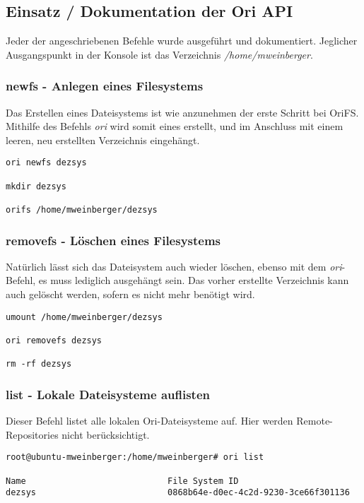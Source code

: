 \subsection{Einsatz / Dokumentation der Ori API}
\label{subsec:Einsatz / Dokumentation der Ori API}
Jeder der angeschriebenen Befehle wurde ausgeführt und dokumentiert. Jeglicher Ausgangspunkt in der Konsole ist das Verzeichnis \textit{/home/mweinberger}.

\subsubsection{newfs - Anlegen eines Filesystems}
\label{subsubsec:newfs - Anlegen eines Filesystems}
Das Erstellen eines Dateisystems ist wie anzunehmen der erste Schritt bei OriFS. Mithilfe des Befehls \textit{ori} wird somit eines erstellt, und im Anschluss mit einem leeren, neu erstellten Verzeichnis eingehängt.
\begin{lstlisting}[frame=single, caption=newfs]
ori newfs dezsys

mkdir dezsys

orifs /home/mweinberger/dezsys
\end{lstlisting}

\subsubsection{removefs - Löschen eines Filesystems}
\label{subsubsec:removefs - Löschen eines Filesystems}
Natürlich lässt sich das Dateisystem auch wieder löschen, ebenso mit dem \textit{ori}-Befehl, es muss lediglich ausgehängt sein. Das vorher erstellte Verzeichnis kann auch gelöscht werden, sofern es nicht mehr benötigt wird.
\begin{lstlisting}[frame=single, caption=removefs]
umount /home/mweinberger/dezsys

ori removefs dezsys

rm -rf dezsys
\end{lstlisting}

\subsubsection{list - Lokale Dateisysteme auflisten}
\label{subsubsec:list - Lokale Dateisysteme auflisten}
Dieser Befehl listet alle lokalen Ori-Dateisysteme auf. Hier werden Remote-Repositories nicht berücksichtigt.
\begin{lstlisting}[frame=single, caption=list]
root@ubuntu-mweinberger:/home/mweinberger# ori list

Name                            File System ID
dezsys                          0868b64e-d0ec-4c2d-9230-3ce66f301136
\end{lstlisting}

